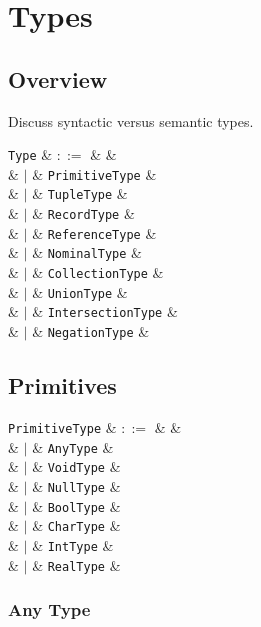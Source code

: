 \chapter{Types}
\section{Overview}
Discuss syntactic versus semantic types.

\begin{syntax}
  \verb+Type+ & $::=$ & &\\
  & $|$ & \verb+PrimitiveType+ &\\
  & $|$ & \verb+TupleType+ &\\
  & $|$ & \verb+RecordType+ &\\
  & $|$ & \verb+ReferenceType+ &\\
  & $|$ & \verb+NominalType+ &\\
  & $|$ & \verb+CollectionType+ &\\
  & $|$ & \verb+UnionType+ &\\
  & $|$ & \verb+IntersectionType+ &\\
  & $|$ & \verb+NegationType+ &\\

\end{syntax}


\section{Primitives}

\begin{syntax}
  \verb+PrimitiveType+ & $::=$ & &\\
  & $|$ & \verb+AnyType+ &\\
  & $|$ & \verb+VoidType+ &\\
  & $|$ & \verb+NullType+ &\\
  & $|$ & \verb+BoolType+ &\\
  & $|$ & \verb+CharType+ &\\
  & $|$ & \verb+IntType+ &\\
  & $|$ & \verb+RealType+ &\\
\end{syntax}



\subsection{Any Type}

